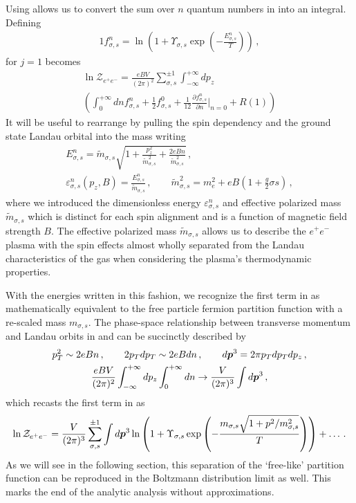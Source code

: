Using  allows us to convert the sum over $n$ quantum numbers in  into an integral. Defining
\begin{alignat}{1}
 \label{Func} f_{\sigma,s}^{n}=\ln\left(1+\Upsilon_{\sigma,s}\exp\left(-\frac{E_{\sigma,s}^{n}}{T}\right)\right)\,,
\end{alignat}
 for $j=1$ becomes
\begin{multline}
 \label{PartFuncTwo} \ln\mathcal{Z}_{e^{+}e^{-}} = \frac{e{B}V}{(2\pi)^{2}}\sum_{\sigma,s}^{\pm1}\int_{-\infty}^{+\infty}dp_{z}\\
 \left(\int_{0}^{+\infty}dn f_{\sigma,s}^{n} + \frac{1}{2}f_{\sigma,s}^{0} + \frac{1}{12}\frac{\partial f_{\sigma,s}^{n}}{\partial n}\bigg\rvert_{n=0} + R(1)\right)
\end{multline}
It will be useful to rearrange  by pulling the spin dependency and the ground state Landau orbital into the mass writing
\begin{gather}
 \label{effmass:1}
 E^{n}_{\sigma,s}={\tilde m}_{\sigma,s}\sqrt{1+\frac{p_{z}^{2}}{{\tilde m}_{\sigma,s}^{2}}+\frac{2e{B}n}{{\tilde m}_{\sigma,s}^{2}}}\,,\\
 \label{effmass:2}
 \varepsilon_{\sigma,s}^{n}(p_{z},{B})=\frac{E_{\sigma,s}^{n}}{{\tilde m}_{\sigma,s}}\,,\qquad{\tilde m}_{\sigma,s}^{2}=m_{e}^{2}+e{B}\left(1+\frac{g}{2}\sigma s\right)\,,
\end{gather}
where we introduced the dimensionless energy $\varepsilon^{n}_{\sigma,s}$ and effective polarized mass ${\tilde m}_{\sigma,s}$ which is distinct for each spin alignment and is a function of magnetic field strength ${B}$. The effective polarized mass ${\tilde m}_{\sigma,s}$ allows us to describe the $e^{+}e^{-}$ plasma with the spin effects almost wholly separated from the Landau characteristics of the gas when considering the plasma's thermodynamic properties.

With the energies written in this fashion, we recognize the first term in  as mathematically equivalent to the free particle fermion partition function with a re-scaled mass $m_{\sigma,s}$. The phase-space relationship between transverse momentum and Landau orbits in  and  can be succinctly described by
\begin{gather}
 p_{T}^{2} \sim 2eBn\,,\qquad2p_{T}dp_{T} \sim 2eBdn\,,\qquad d\boldsymbol{p}^{3}=2\pi p_{T}dp_{T}dp_{z}\,,\\
 \frac{eBV}{(2\pi)^{2}}\int_{-\infty}^{+\infty}dp_{z}\int_{0}^{+\infty}dn \rightarrow \frac{V}{(2\pi)^{3}}\int d\boldsymbol{p}^{3}\,,
\end{gather}
which recasts the first term in  as
\begin{align}
 \label{FreePart}
 \ln\mathcal{Z}_{e^{+}e^{-}} = \frac{V}{(2\pi)^{3}}\sum_{\sigma,s}^{\pm1}\int d\boldsymbol{p}^{3}\ln\left(1+\Upsilon_{\sigma,s}\exp{\left(-\frac{m_{\sigma,s}\sqrt{1+p^{2}/m_{\sigma,s}^{2}}}{T}\right)}\right)+\ldots\,.
\end{align}
As we will see in the following section, this separation of the `free-like' partition function can be reproduced in the Boltzmann distribution limit as well. This marks the end of the analytic analysis without approximations.

